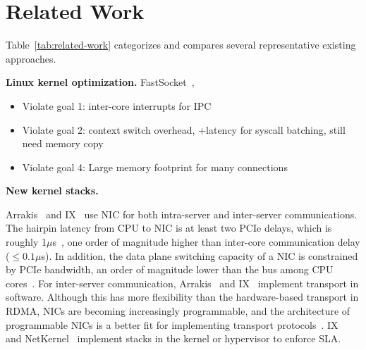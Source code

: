 \section{Related Work}
\label{sec:related}


Table~\ref{tab:related-work} categorizes and compares several representative existing approaches.

\textbf{Linux kernel optimization.}
FastSocket~\cite{lin2016scalable}, 

\begin{itemize}
	\item
	Violate goal 1: inter-core interrupts for IPC 
	\item
	Violate goal 2: context switch overhead, +latency for syscall batching, still need memory copy 
	\item 
	Violate goal 4: Large memory footprint for many connections 
\end{itemize}

\textbf{New kernel stacks.}


\iffalse
Kernel-bypass TCP/IPs
IX [OSDI’14], Arrakis [OSDI’14], UTCP [CCR’14], Sandstorm [SIGCOMM’14], mTCP [NSDI’14], Seastar

Socket API enhancements
MegaPipe [OSDI’12], FlexSC [OSDI’10], KCM [Linux]

Improving OS stack with fast packet I/O
mSwitch [SOSR’15]

In-stack improvement
FastSocket [ASPLOS’16]

Running kernel stack in user-space
Rump [AsiaBSDCon’09], NUSE [netdev’15]
\fi



Arrakis~\cite{peter2016arrakis} and IX~\cite{belay2017ix} use NIC for both intra-server and inter-server communications. The hairpin latency from CPU to NIC is at least two PCIe delays, which is roughly 1$\mu$s~\cite{kaminsky2016design}, one order of magnitude higher than inter-core communication delay ($\leq0.1\mu$s). In addition, the data plane switching capacity of a NIC is constrained by PCIe bandwidth, an order of magnitude lower than the bus among CPU cores~\cite{li2017kv}. For inter-server communication, Arrakis~\cite{peter2016arrakis} and IX~\cite{belay2017ix} implement transport in software. Although this has more flexibility than the hardware-based transport in RDMA, NICs are becoming increasingly programmable, and the architecture of programmable NICs is a better fit for implementing transport protocols~\cite{kaufmann2015flexnic,smartnic,mellanox,cavium}. 
IX~\cite{belay2017ix} and NetKernel~\cite{niu2017network} implement stacks in the kernel or hypervisor to enforce SLA.


